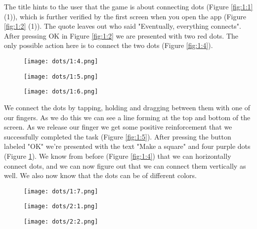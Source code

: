 The title hints to the user that the game is about connecting dots (Figure \ref{fig:1:1}(1)), which is further verified by the first screen when you open the app (Figure \ref{fig:1:2} (1)). The quote leaves out who said "Eventually, everything connects". After pressing OK in Figure \ref{fig:1:2} we are presented with two red dots. The only possible action here is to connect the two dots (Figure \ref{fig:1:4}).

\begin{figure}
\centering
\captionsetup{format=multiline,font=footnotesize}
\begin{minipage}{.33333\textwidth}
  \centering
  \texttt{[image: dots/1:4.png]}
  \label{fig:1:4}
\end{minipage}%
\begin{minipage}{.33333\textwidth}
  \centering
  \texttt{[image: dots/1:5.png]}
  \label{fig:1:5}
\end{minipage}%
\begin{minipage}{.33333\textwidth}
  \centering
  \texttt{[image: dots/1:6.png]}
  \label{fig:1:6}
\end{minipage}
\end{figure}

We connect the dots by tapping, holding and dragging between them with one of our fingers. As we do this we can see a line forming at the top and bottom of the screen. As we release our finger we get some positive reinforcement that we successfully completed the task (Figure \ref{fig:1:5}). After pressing the button labeled "OK" we're presented with the text "Make a square" and four purple dots (Figure \ref{fig:1:6}). We know from before (Figure \ref{fig:1:4}) that we can horizontally connect dots, and we can now figure out that we can connect them vertically as well. We also now know that the dots can be of different colors.

\begin{figure}
\centering
\captionsetup{format=multiline,font=footnotesize}
\captionsetup{format=multiline,font=footnotesize}
\begin{minipage}{.33333\textwidth}
  \centering
  \texttt{[image: dots/1:7.png]}
  \label{fig:1:7}
\end{minipage}%
\begin{minipage}{.33333\textwidth}
  \centering
  \texttt{[image: dots/2:1.png]}
  \label{fig:2:1}
\end{minipage}%
\begin{minipage}{.33333\textwidth}
  \centering
  \texttt{[image: dots/2:2.png]}
  \label{fig:2:2}
\end{minipage}
\end{figure}

